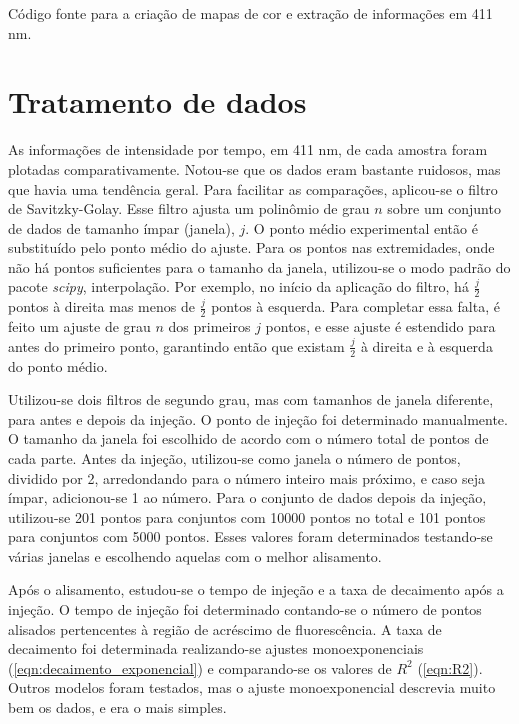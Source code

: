 			\begin{listing}[h]
				\inputminted{python}{./python/fluor_plot_inicial.py}
				\caption{Código fonte para a criação de mapas de cor e extração de informações em 411 nm.}
				\label{lst:extracao_fluor1}
			\end{listing}
			
		\section{Tratamento de dados}  
		
			As informações de intensidade por tempo, em 411 nm, de cada amostra foram plotadas comparativamente. Notou-se que os dados eram bastante ruidosos, mas que havia uma tendência geral. Para facilitar as comparações, aplicou-se o filtro de Savitzky-Golay. Esse filtro ajusta um polinômio de grau \(n\) sobre um conjunto de dados de tamanho ímpar (janela), \(j\). O ponto médio experimental então é substituído pelo ponto médio do ajuste. Para os pontos nas extremidades, onde não há pontos suficientes para o tamanho da janela, utilizou-se o modo padrão do pacote \emph{scipy}, interpolação. Por exemplo, no início da aplicação do filtro, há \(\frac{j}{2}\) pontos à direita mas menos de \(\frac{j}{2}\) pontos à esquerda. Para completar essa falta, é feito um ajuste de grau \(n\) dos primeiros \(j\) pontos, e esse ajuste é estendido para antes do primeiro ponto, garantindo então que existam \(\frac{j}{2}\) à direita e à esquerda do ponto médio.
			
			Utilizou-se dois filtros de segundo grau, mas com tamanhos de janela diferente, para antes e depois da injeção. O ponto de injeção foi determinado manualmente. O tamanho da janela foi escolhido de acordo com o número total de pontos de cada parte. Antes da injeção, utilizou-se como janela o número de pontos, dividido por 2, arredondando para o número inteiro mais próximo, e caso seja ímpar, adicionou-se 1 ao número. Para o conjunto de dados depois da injeção, utilizou-se 201 pontos para conjuntos com 10000 pontos no total e 101 pontos para conjuntos com 5000 pontos. Esses valores foram determinados testando-se várias janelas e escolhendo aquelas com o melhor alisamento.
			
			Após o alisamento, estudou-se o tempo de injeção e a taxa de decaimento após a injeção. O tempo de injeção foi determinado contando-se o número de pontos alisados pertencentes à região de acréscimo de fluorescência. A taxa de decaimento foi determinada realizando-se ajustes monoexponenciais (\autoref{eqn:decaimento_exponencial}) e comparando-se os valores de \(R^2\) (\autoref{eqn:R2}). Outros modelos foram testados, mas o ajuste monoexponencial descrevia muito bem os dados, e era o mais simples.
			
